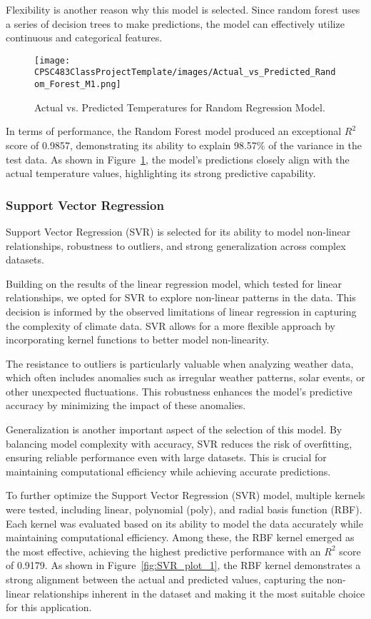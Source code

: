 \documentclass[conference]{IEEEtran}
\begin{document}
Flexibility is another reason why this model is selected. Since random forest uses a series of decision trees to make predictions, the model can effectively utilize continuous and categorical features.

\begin{figure}[htbp]
\centering
\texttt{[image: CPSC483ClassProjectTemplate/images/Actual\_vs\_Predicted\_Random\_Forest\_M1.png]}
\caption{Actual vs. Predicted Temperatures for Random Regression Model.}
\label{fig:random_forest_plot}
\end{figure}

In terms of performance, the Random Forest model produced an exceptional \(R^2\) score of 0.9857, demonstrating its ability to explain 98.57\% of the variance in the test data. As shown in Figure~\ref{fig:random_forest_plot}, the model's predictions closely align with the actual temperature values, highlighting its strong predictive capability.

\subsubsection{Support Vector Regression}
Support Vector Regression (SVR) is selected for its ability to model non-linear relationships, robustness to outliers, and strong generalization across complex datasets.

Building on the results of the linear regression model, which tested for linear relationships, we opted for SVR to explore non-linear patterns in the data. This decision is informed by the observed limitations of linear regression in capturing the complexity of climate data. SVR allows for a more flexible approach by incorporating kernel functions to better model non-linearity.

The resistance to outliers is particularly valuable when analyzing weather data, which often includes anomalies such as irregular weather patterns, solar events, or other unexpected fluctuations. This robustness enhances the model's predictive accuracy by minimizing the impact of these anomalies.

Generalization is another important aspect of the selection of this model. By balancing model complexity with accuracy, SVR reduces the risk of overfitting, ensuring reliable performance even with large datasets. This is crucial for maintaining computational efficiency while achieving accurate predictions.

To further optimize the Support Vector Regression (SVR) model, multiple kernels were tested, including linear, polynomial (poly), and radial basis function (RBF). Each kernel was evaluated based on its ability to model the data accurately while maintaining computational efficiency. Among these, the RBF kernel emerged as the most effective, achieving the highest predictive performance with an \(R^2\) score of 0.9179. As shown in Figure~\ref{fig:SVR_plot_1}, the RBF kernel demonstrates a strong alignment between the actual and predicted values, capturing the non-linear relationships inherent in the dataset and making it the most suitable choice for this application.
\end{document}
